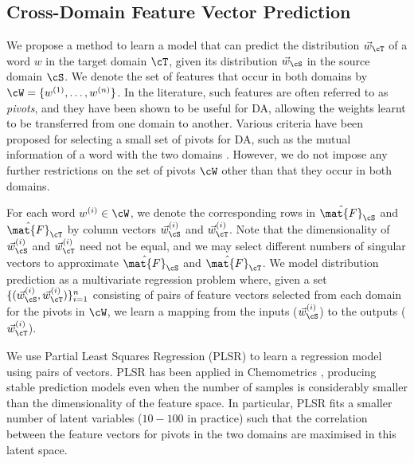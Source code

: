 \documentclass[11pt]{article}
\begin{document}
 
\subsection{Cross-Domain Feature Vector Prediction}
\label{sec:crossdomain}

We propose a method to learn a model that can predict the distribution $\vec{w}_{\cT}$ of a word
$w$ in the target domain $\cT$, given its distribution $\vec{w}_{\cS}$ in the source domain $\cS$.
We denote the set of features that occur in both domains by $\cW=\{w^{(1)}, \ldots, w^{(n)}\}$. 
In the literature, such features are often referred to as \textit{pivots},
and they have been shown to be useful for DA, allowing the
weights learnt to be transferred from one domain to another.
Various criteria have been proposed for selecting a small set of pivots for
DA, such as the mutual information of a word with the two domains \cite{Blitzer:ACL:2007}.
However, we do not impose any further restrictions on the set of pivots $\cW$ other than
that they occur in both domains.

For each word $w^{(i)}\in\cW$, we denote the corresponding rows in $\hat{\mat{F}}_{\cS}$ and $\hat{\mat{F}}_{\cT}$
by column vectors $\vec{w}_{\cS}^{(i)}$ and $\vec{w}_{\cT}^{(i)}$.
Note that the dimensionality of $\vec{w}_{\cS}^{(i)}$ and $\vec{w}_{\cT}^{(i)}$ need not be equal,
and we may select different numbers of singular vectors to approximate  $\hat{\mat{F}}_{\cS}$ and $\hat{\mat{F}}_{\cT}$.
We model distribution prediction as a multivariate regression
problem where, given a set $\{(\vec{w}_{\cS}^{(i)},\vec{w}_{\cT}^{(i)})\}^{n}_{i=1}$ consisting of pairs
of feature vectors selected from each domain for the pivots in $\cW$, we  learn a mapping 
from the inputs ($\vec{w}_{\cS}^{(i)}$) to the outputs ($\vec{w}_{\cT}^{(i)}$).

We use Partial Least Squares Regression (PLSR) \cite{Wold:85} to learn a regression model
using pairs of vectors. PLSR has been  applied in Chemometrics \cite{Geladi19861}, producing
stable prediction models even when the number of samples is considerably smaller than the
dimensionality of the feature space. In particular, PLSR fits a smaller number of latent variables ($10-100$ in practice)
such that the correlation between the feature vectors for pivots in the two domains
are maximised in this latent space.
\end{document}
